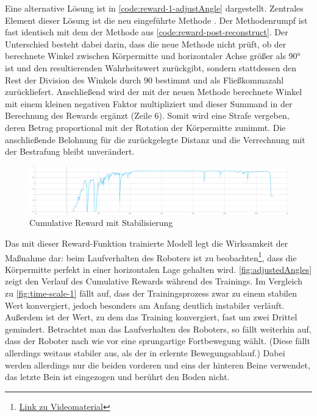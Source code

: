 \begin{figure}
    
\end{figure}

Eine alternative Lösung ist in \autoref{code:reward-1-adjustAngle} dargestellt.
Zentrales Element dieser Lösung ist die neu eingeführte Methode .
Der Methodenrumpf ist fast identisch mit dem der Methode  aus \autoref{code:reward-post-reconstruct}.
Der Unterschied besteht dabei darin, dass die neue Methode nicht prüft, ob der berechnete Winkel zwischen Körpermitte und horizontaler Achse größer als 90° ist und den resultierenden Wahrheitswert zurückgibt, sondern stattdessen den Rest der Division des Winkels durch 90 bestimmt und als Fließkommazahl zurückliefert.
Anschließend wird der mit der neuen Methode berechnete Winkel mit einem kleinen negativen Faktor multipliziert und dieser Summand in der Berechnung des Rewards ergänzt (Zeile 6).
Somit wird eine Strafe vergeben, deren Betrag proportional mit der Rotation der Körpermitte zunimmt.
Die anschließende Belohnung für die zurückgelegte Distanz und die Verrechnung mit der Bestrafung bleibt unverändert.

\begin{figure}
    \centering
    \includegraphics[width=\textwidth]{Bilder/ml-agents/Environment_Cumulative Reward_adjustedAngles.pdf}
    \caption{Cumulative Reward mit Stabilisierung}
    \label{fig:adjustedAngles}
\end{figure}

Das mit dieser Reward-Funktion trainierte Modell legt die Wirksamkeit der Maßnahme dar: beim Laufverhalten des Roboters ist zu beobachten\footnote{\href{https://github.com/yschiebelhut/studienarbeit-doc/raw/master/Videos/SpiderBotDemos/adjustedAngles.webm}{Link zu Videomaterial}}, dass die Körpermitte perfekt in einer horizontalen Lage gehalten wird.
\autoref{fig:adjustedAngles} zeigt den Verlauf des Cumulative Rewards während des Trainings.
Im Vergleich zu \autoref{fig:time-scale-1} fällt auf, dass der Trainingsprozess zwar zu einem stabilen Wert konvergiert, jedoch besonders am Anfang deutlich instabiler verläuft.
Außerdem ist der Wert, zu dem das Training konvergiert, fast um zwei Drittel gemindert.
Betrachtet man das Laufverhalten des Roboters, so fällt weiterhin auf, dass der Roboter nach wie vor eine sprungartige Fortbewegung wählt.
(Diese fällt allerdings weitaus stabiler aus, als der in \cite{waidner.2020} erlernte Bewegungsablauf.)
Dabei werden allerdings nur die beiden vorderen und eins der hinteren Beine verwendet, das letzte Bein ist eingezogen und berührt den Boden nicht.

